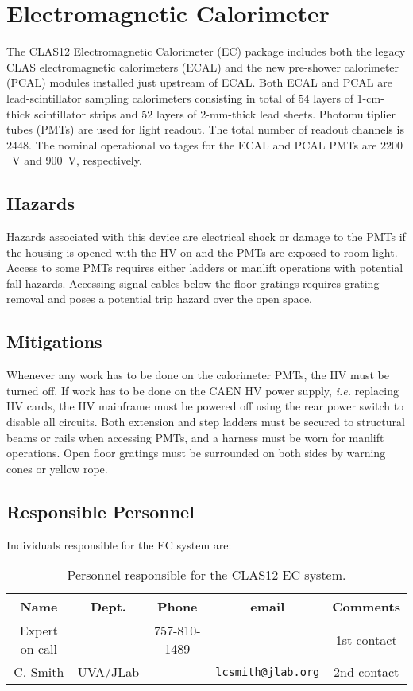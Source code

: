 \section{Electromagnetic Calorimeter}

The CLAS12 Electromagnetic Calorimeter (EC) package includes both the legacy CLAS 
electromagnetic calorimeters (ECAL) and the new pre-shower calorimeter (PCAL) modules 
installed just upstream of ECAL. Both ECAL and PCAL are lead-scintillator sampling 
calorimeters consisting in total of $54$ layers of 1-cm-thick scintillator strips and 
$52$ layers of 2-mm-thick lead sheets. Photomultiplier tubes (PMTs) are used for light 
readout. The total number of readout channels is $2448$. The nominal operational voltages 
for the ECAL and PCAL PMTs are $2200$~V and $900$~V, respectively. 

\subsection{Hazards} 

Hazards associated with this device are electrical shock or damage to the PMTs if the 
housing is opened with the HV on and the PMTs are exposed to room light.  Access to some 
PMTs requires either ladders or manlift operations with potential fall hazards. Accessing 
signal cables below the floor gratings requires grating removal and poses a potential trip 
hazard over the open space. 

\subsection{Mitigations}

Whenever any work has to be done on the calorimeter PMTs, the HV must be turned off. If work 
has to be done on the CAEN HV power supply, {\it i.e.} replacing HV cards, the HV mainframe must 
be powered off using the rear power switch to disable all circuits. Both extension and step 
ladders must be secured to structural beams or rails when accessing PMTs, and a harness must 
be worn for manlift operations. Open floor gratings must be surrounded on both sides by 
warning cones or yellow rope.       

\subsection{Responsible Personnel}

Individuals responsible for the EC system are:

\begin{table}[!htb]
\centering
\begin{tabular}{|c|c|c|c|c|} \hline
Name&Dept.&Phone&email&Comments \\ \hline
Expert on call& &757-810-1489&& 1st contact \\ \hline
C. Smith &UVA/JLab&&\href{mailto:lcsmith@jlab.org}{\nolinkurl{lcsmith@jlab.org}}&2nd contact \\ \hline
\end{tabular}
\caption{Personnel responsible for the CLAS12 EC system.} 
\label{tb:ec}
\end{table}

